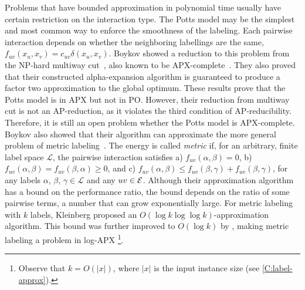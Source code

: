 Problems that have bounded approximation in polynomial time usually have certain restriction on the interaction type. The Potts model may be the simplest and most common way to enforce the smoothness of the labeling. Each pairwise interaction depends on whether the neighboring labellings are the same, \ie $f_{uv}(x_u,x_v) = c_{uv}\delta(x_u, x_v)$.  Boykov \etal showed a reduction to this problem from the NP-hard multiway cut~\cite{boykov2001approximate}, also known to be APX-complete~\cite{ausiello1999complexity, dahlhaus1994complexity}. They also proved that their constructed alpha-expansion algorithm is guaranteed to produce a factor two approximation to the global optimum. These results prove that the Potts model is in APX but not in PO. However, their reduction from multiway cut is not an AP-reduction, as it violates the third condition of AP-reducibility. Therefore, it is still an open problem whether the Potts model is APX-complete.
Boykov \etal also showed that their algorithm can approximate the more general problem of metric labeling~\cite{boykov2001approximate}. The energy is called {\em metric} if, for an arbitrary, finite label space $\mathcal{L}$, the pairwise interaction satisfies a) $ f_{uv}(\alpha, \beta) = 0$, b) $f_{uv}(\alpha, \beta) = f_{uv}(\beta, \alpha) \geq 0$, and c) $f_{uv}(\alpha, \beta) \leq f_{uv}(\beta, \gamma) + f_{uv}(\beta, \gamma)$,
for any labels $\alpha$, $\beta$, $\gamma \in \mathcal{L}$ and any $uv \in \mathcal{E}$. Although their approximation algorithm has a bound on the performance ratio, the bound depends on the ratio of some pairwise terms, a number that can grow exponentially large. For metric labeling with $k$ labels, Kleinberg \etal proposed an $O(\log k \log \log k)$-approximation algorithm. This bound was further improved to $O(\log k)$ by \citet{Chekuri:2005:LPF}, making metric labeling a problem in log-APX \footnote{Observe that $k = O(|x|)$, where $|x|$ is the input instance size (see \cref{C:label-approx}). }.

